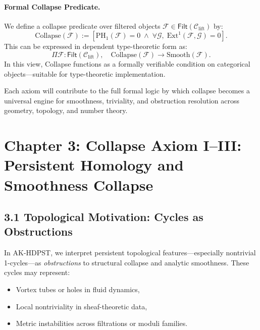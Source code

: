 \documentclass[11pt]{article}
\begin{document}
\paragraph{Formal Collapse Predicate.}  
We define a collapse predicate over filtered objects \( \mathcal{F} \in \mathsf{Filt}(\mathcal{C}_{\text{lift}}) \) by:
\[
\mathrm{Collapse}(\mathcal{F}) := \left[ \mathrm{PH}_1(\mathcal{F}) = 0 \; \wedge \; \forall \mathcal{G}, \; \mathrm{Ext}^1(\mathcal{F}, \mathcal{G}) = 0 \right].
\]
This can be expressed in dependent type-theoretic form as:
\[
\Pi \mathcal{F} : \mathsf{Filt}(\mathcal{C}_{\text{lift}}), \quad \mathrm{Collapse}(\mathcal{F}) \to \mathrm{Smooth}(\mathcal{F}).
\]
In this view, Collapse functions as a formally verifiable condition on categorical objects—suitable for type-theoretic implementation.

Each axiom will contribute to the full formal logic by which collapse becomes a universal engine  
for smoothness, triviality, and obstruction resolution across geometry, topology, and number theory.



\section{Chapter 3: Collapse Axiom I–III: Persistent Homology and Smoothness Collapse}

\subsection*{3.1 Topological Motivation: Cycles as Obstructions}

In AK-HDPST, we interpret persistent topological features—especially nontrivial 1-cycles—as \emph{obstructions}  
to structural collapse and analytic smoothness. These cycles may represent:

\begin{itemize}
  \item Vortex tubes or holes in fluid dynamics,
  \item Local nontriviality in sheaf-theoretic data,
  \item Metric instabilities across filtrations or moduli families.
\end{itemize}
\end{document}
